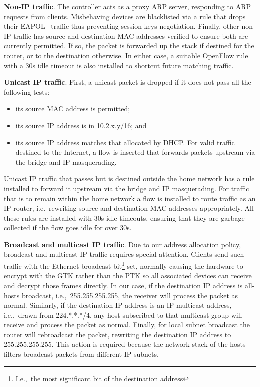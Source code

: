\textbf{Non-IP traffic}.  The controller acts as a proxy ARP server, responding
to ARP requests from clients.  Misbehaving devices are blacklisted via a rule
that drops their EAPOL~\cite{rfc:3748} traffic thus preventing session keys
negotiation.
Finally, other non-IP traffic has source and destination MAC addresses verified
to ensure both are currently permitted.  If so, the packet is forwarded up the
stack if destined for the router, or to the destination otherwise.  In either
case, a suitable OpenFlow rule with a 30s idle timeout is also installed to
shortcut future matching traffic.

\textbf{Unicast IP traffic}.  First, a unicast packet is dropped if it does not
pass all the following tests: \begin{itemize}
    \item its source MAC address is permitted; 
    \item its source IP address is in 10.2.x.y/16; and
    \item its source IP address matches that allocated by DHCP.  For valid
      traffic destined to the Internet, a flow is inserted that forwards packets
      upstream via the bridge and IP masquerading.  \end{itemize} Unicast IP
  traffic that passes but is destined outside the home network has a rule
  installed to forward it upstream via the bridge and IP masquerading.  For
  traffic that is to remain within the home network a flow is installed to route
  traffic as an IP router, i.e.~rewriting source and destination MAC addresses
  appropriately.  All these rules are installed with 30s idle timeouts, ensuring
  that they are garbage collected if the flow goes idle for over 30s.

\textbf{Broadcast and multicast IP traffic}.  Due to our address allocation
policy, broadcast and multicast IP traffic requires special attention.  Clients
send such traffic with the Ethernet broadcast bit\footnote{I.e.,~the most
  significant bit of the destination address} set, normally causing the hardware
to encrypt with the GTK rather than the PTK so all associated devices can
receive and decrypt those frames directly.  In our case, if the destination IP
address is all-hosts broadcast, i.e.,~255.255.255.255, the receiver will process
the packet as normal.  Similarly, if the destination IP address is an IP
multicast address, i.e.,~drawn from 224.*.*.*/4, any host subscribed to that
multicast group will receive and process the packet as normal. Finally, for
local subnet broadcast the router will rebroadcast the packet, rewriting the
destination IP address to 255.255.255.255. This action is required because the
network stack of the hosts filters broadcast packets from different IP subnets.

